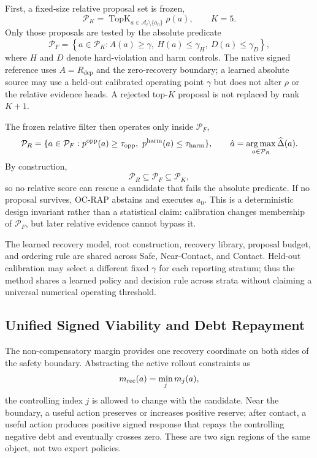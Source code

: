 \documentclass{article} %
\DeclareMathOperator*{\argmax}{arg\,max}
\DeclareMathOperator{\TopK}{TopK}
\newcommand{\cA}{\mathcal{A}}
\newcommand{\cP}{\mathcal{P}}
\newcommand{\Rdep}{R_{\mathrm{dep}}}
\begin{document}
First, a fixed-size relative proposal set is frozen,
\begin{equation}
 \cP_K=\TopK_{a\in\cA_t\setminus\{a_0\}}\rho(a),
 \qquad K=5.
 \label{eq:rifa_topk}
\end{equation}
Only those proposals are tested by the absolute predicate
\begin{equation}
 \cP_F=\left\{a\in\cP_K:
 A(a)\ge\gamma,\ H(a)\le\gamma_H,\ D(a)\le\gamma_D\right\},
 \label{eq:abs_admission}
\end{equation}
where $H$ and $D$ denote hard-violation and harm controls. The native signed reference uses $A=\Rdep$ and the zero-recovery boundary; a learned absolute source may use a held-out calibrated operating point $\gamma$ but does not alter $\rho$ or the relative evidence heads. A rejected top-$K$ proposal is not replaced by rank $K+1$.

The frozen relative filter then operates only inside $\cP_F$,
\begin{equation}
 \cP_R=\{a\in\cP_F:p^{\rm opp}(a)\ge\tau_{\rm opp},\ p^{\rm harm}(a)\le\tau_{\rm harm}\},
 \qquad
 \hat a=\argmax_{a\in\cP_R}\widehat\Delta(a).
 \label{eq:relative_filter}
\end{equation}
By construction,
\begin{equation}
 \boxed{\cP_R\subseteq\cP_F\subseteq\cP_K},
 \label{eq:rifa_nesting}
\end{equation}
so no relative score can rescue a candidate that fails the absolute predicate. If no proposal survives, OC-RAP abstains and executes $a_0$. This is a deterministic design invariant rather than a statistical claim: calibration changes membership of $\cP_F$, but later relative evidence cannot bypass it.

The learned recovery model, root construction, recovery library, proposal budget, and ordering rule are shared across Safe, Near-Contact, and Contact. Held-out calibration may select a different fixed $\gamma$ for each reporting stratum; thus the method shares a learned policy and decision rule across strata without claiming a universal numerical operating threshold.

\subsection{Unified Signed Viability and Debt Repayment}
\label{subsec:unified_regimes}

The non-compensatory margin provides one recovery coordinate on both sides of the safety boundary. Abstracting the active rollout constraints as
\begin{equation}
 m_{\rm rec}(a)=\min_j m_j(a),
 \label{eq:unified_min_margin}
\end{equation}
the controlling index $j$ is allowed to change with the candidate. Near the boundary, a useful action preserves or increases positive reserve; after contact, a useful action produces positive signed response that repays the controlling negative debt and eventually crosses zero. These are two sign regions of the same object, not two expert policies.
\end{document}
